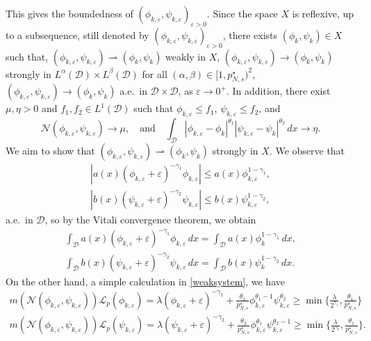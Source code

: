 \documentclass[10pt,a4paper]{amsart}
\numberwithin{equation}{section}
\begin{document}
This gives the boundedness of 
$(\phi_{k,\varepsilon},\psi_{k,\varepsilon})_{\varepsilon>0}$. 
Since the space $X$ is reflexive, up to a subsequence, still denoted by 
$(\phi_{k,\varepsilon},\psi_{k,\varepsilon})_{\varepsilon>0}$, there exists 
$(\phi_k,\psi_k)\in X$ such that, 
$(\phi_{k,\varepsilon},\psi_{k,\varepsilon})\rightharpoonup (\phi_k,\psi_k)$ 
weakly in $X$, $(\phi_{k,\varepsilon},\psi_{k,\varepsilon})\to (\phi_k,\psi_k)$ 
strongly in 
$L^\alpha(\mathcal{D})\times L^\beta(\mathcal{D})$  for all $(\alpha,\beta)\in [1,p^\star_{N,s})^2$,
$(\phi_{k,\varepsilon},\psi_{k,\varepsilon})\to (\phi_k,\psi_k)$  a.e.\
in $\mathcal{D}\times \mathcal{D}$, as $\varepsilon\to 0^+$. In addition, there exist
$\mu,\eta>0$ and $f_1,f_2\in L^1(\mathcal{D})$ such that $\phi_{k,\varepsilon}\leq f_1$, 
$\psi_{k,\varepsilon}\leq f_2$, and
\begin{equation}\label{eq22}
\mathcal{N}(\phi_{k,\varepsilon},\psi_{k,\varepsilon})\to \mu,\quad \text{and}\quad
\int_\mathcal{D} |\phi_{k,\varepsilon}-\phi_k|^{\theta_1}|\psi_{k,\varepsilon}
-\psi_k|^{\theta_2}\,dx\to \eta.
\end{equation}
We aim to show that 
$(\phi_{k,\varepsilon},\psi_{k,\varepsilon})\rightharpoonup (\phi_k,\psi_k)$ 
strongly in $X$. We observe that
\begin{gather*}
|a(x) (\phi_{k,\varepsilon}+\varepsilon)^{-\gamma_1}\phi_{k,\varepsilon}|
\leq a(x)\phi_{k,\varepsilon}^{1-\gamma_1}, \\
|b(x) (\psi_{k,\varepsilon}+\varepsilon)^{-\gamma_2}\psi_{k,\varepsilon}|
\leq b(x)\psi_{k,\varepsilon}^{1-\gamma_2}, 
\end{gather*}
a.e.\ in $\mathcal{D}$, so by the Vitali convergence theorem, we obtain
\begin{gather}\label{eq33}
\int_\mathcal{D}a(x) (\phi_{k,\varepsilon}+\varepsilon)^{-\gamma_1}
\phi_{k,\varepsilon}\,dx=\int_\mathcal{D}a(x)\phi_k^{1-\gamma_1}\,dx,\\
\label{eq44}
\int_\mathcal{D}b(x) (\psi_{k,\varepsilon}+\varepsilon)^{-\gamma_2}
\psi_{k,\varepsilon}\,dx=\int_\mathcal{D}b(x)\psi_k^{1-\gamma_2}\,dx.
\end{gather}
On the other hand, a simple calculation in \eqref{weaksystem}, we have
\begin{gather*}
m(\mathcal{N}(\phi_{k,\varepsilon},\psi_{k,\varepsilon}))
\mathcal{L}_p(\phi_{k,\varepsilon})=\lambda(\phi_{k,\varepsilon}
 +\varepsilon)^{-\gamma_1}+\frac{\theta_1}{p^\star_{N,s}}\phi_{k,\varepsilon}^{\theta_1-1}\psi_{k,\varepsilon}^{\theta_2}\geq \min\lbrace \frac{\lambda}{2^{\gamma_1}} ,\frac{\theta_1}{p^\star_{N,s}}\rbrace  \\
m(\mathcal{N}(\phi_{k,\varepsilon},\psi_{k,\varepsilon}))\mathcal{L}_p
 (\psi_{k,\varepsilon})=\lambda(\psi_{k,\varepsilon}+\varepsilon)^{-\gamma_2}
 +\frac{\theta_2}{p^\star_{N,s}}\phi_{k,\varepsilon}^{\theta_1}
 \psi_{k,\varepsilon}^{\theta_2-1}\geq \min\lbrace  
 \frac{\lambda}{2^{\gamma_2}},\frac{\theta_1}{p^\star_{N,s}}\rbrace.
\end{gather*}
\end{document}
